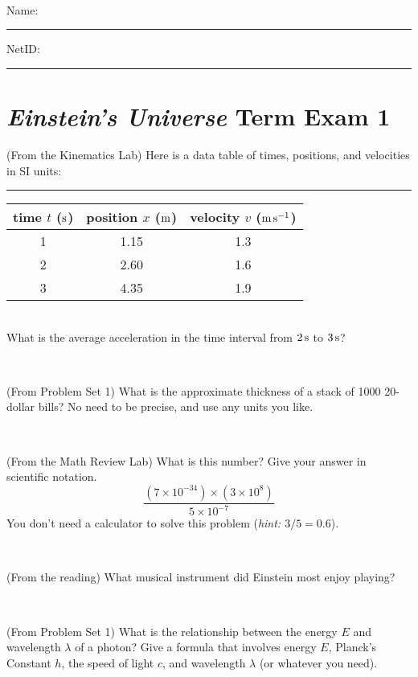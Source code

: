 \documentclass[12pt, letterpaper]{article}
\begin{document}
\vfill ~


\cleardoublepage



\noindent
Name: \rule[-1ex]{0.60\textwidth}{0.1pt}
NetID: \rule[-1ex]{0.20\textwidth}{0.1pt}

\section*{\textsl{Einstein's Universe} Term Exam 1}
\setcounter{problem}{1}


\begin{problem} (From the Kinematics Lab)
Here is a data table of times, positions, and velocities in SI units:\\
\rule{1.0in}{0pt}\begin{tabular}{c|c|c}
time $t$ ($\mathrm{s}$) & position $x$ ($\mathrm{m}$) & velocity $v$ ($\mathrm{m}\,\mathrm{s}^{-1}$) \\
\hline
1 & 1.15 & 1.3 \\
2 & 2.60 & 1.6 \\
3 & 4.35 & 1.9 \\
\hline
\end{tabular}\\
What is the average acceleration in the time interval from $2\,\mathrm{s}$ to $3\,\mathrm{s}$?
\end{problem}


\vfill ~

\begin{problem} (From Problem Set 1)
What is the approximate thickness of a stack of 1000 20-dollar bills?
No need to be precise, and use any units you like.
\end{problem}


\vfill ~

\begin{problem} (From the Math Review Lab)
What is this number? Give your answer in scientific notation.
$$
\frac{(7\times10^{-34})\times(3\times10^8)}{5\times10^{-7}}
$$
You don't need a calculator to solve this problem (\textit{hint: $3/5=0.6$}).
\end{problem}


\vfill ~

\begin{problem} (From the reading)
What musical instrument did Einstein most enjoy playing?
\end{problem}


\vfill ~


\clearpage


\begin{problem} (From Problem Set 1)
What is the relationship between the energy $E$ and wavelength
$\lambda$ of a photon? Give a formula that involves energy $E$,
Planck's Constant $h$, the speed of light $c$, and wavelength
$\lambda$ (or whatever you need).
\end{problem}
\end{document}
